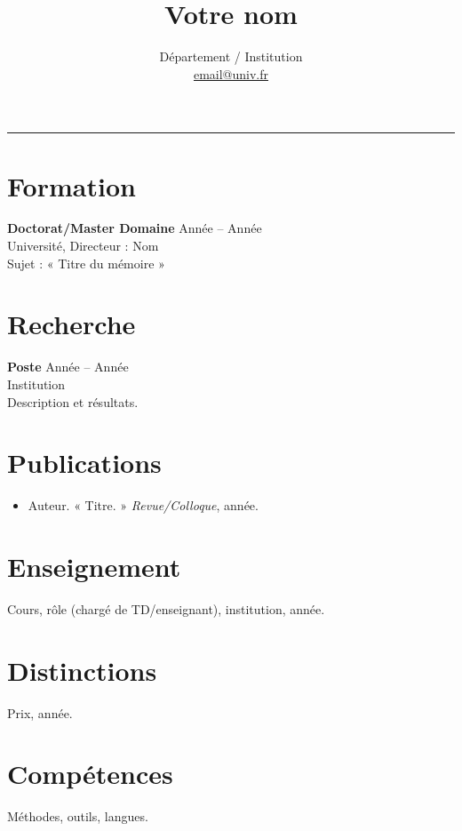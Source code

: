 \documentclass[11pt,a4paper]{article}
\title{\vspace{-1cm}\textbf{Votre nom}}
\author{Département / Institution \\ \href{mailto:email@univ.fr}{email@univ.fr}}
\date{}
\begin{document}
\maketitle
\vspace{-0.6cm}
\begin{flushright}\rule{2cm}{2.5cm}\end{flushright}
\section*{Formation}
\textbf{Doctorat/Master Domaine} \hfill Année -- Année \\
Université, Directeur : Nom \\
Sujet : « Titre du mémoire »

\section*{Recherche}
\textbf{Poste} \hfill Année -- Année \\
Institution \\
Description et résultats.

\section*{Publications}
\begin{itemize}
  \item Auteur. « Titre. » \textit{Revue/Colloque}, année.
\end{itemize}

\section*{Enseignement}
Cours, rôle (chargé de TD/enseignant), institution, année.

\section*{Distinctions}
Prix, année.

\section*{Compétences}
Méthodes, outils, langues.
\end{document}
